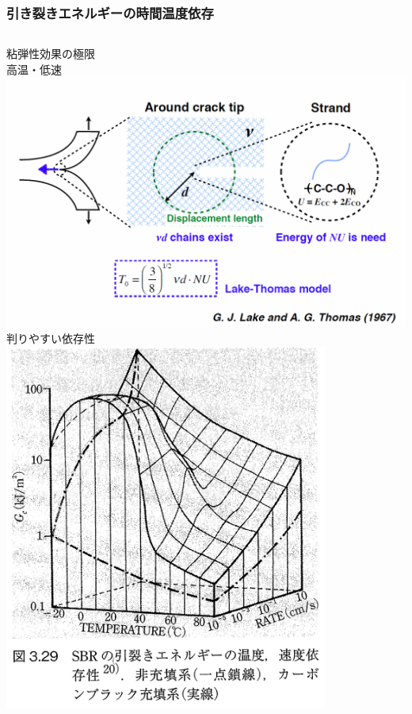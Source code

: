 \documentclass[11pt, dvipdfmx]{beamer}
\begin{document}
\begin{frame}
\frametitle{引き裂きエネルギーの時間温度依存}
\begin{columns}[totalwidth=1\textwidth]
粘弾性効果の極限\\
高温・低速
\includegraphics[width=\textwidth]{./fig/Lake_Thomas.png}
判りやすい依存性
\includegraphics[width=0.8\textwidth]{./fig/break_TT.png}
\end{columns}
\end{frame}
\end{document}
